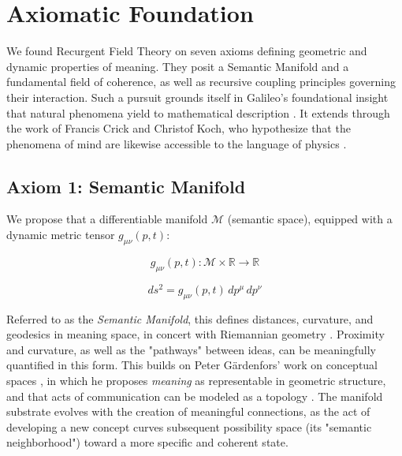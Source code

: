 \chapter{Axiomatic Foundation}
\label{1:axiomatic_foundation}

We found Recurgent Field Theory on seven axioms defining geometric and dynamic properties of meaning. They posit a Semantic Manifold and a fundamental field of coherence, as well as recursive coupling principles governing their interaction. Such a pursuit grounds itself in Galileo's foundational insight that natural phenomena yield to mathematical description \autocite{Galilei1623}. It extends through the work of Francis Crick and Christof Koch, who hypothesize that the phenomena of mind are likewise accessible to the language of physics \autocite{Crick1990, KochConsciousness2019}.


\section{Axiom 1: Semantic Manifold}
\label{1.1:axiom_1_semantic_manifold}

We propose that a differentiable manifold \(\mathcal{M}\) (semantic space), equipped with a dynamic metric tensor \(g_{\mu\nu}(p,t)\):

\begin{equation}
g_{\mu\nu}(p,t) : \mathcal{M} \times \mathbb{R} \rightarrow \mathbb{R}
\end{equation}

\begin{equation}
ds^2 = g_{\mu\nu}(p,t) \, dp^\mu \, dp^\nu
\end{equation}

Referred to as the \textit{Semantic Manifold}, this defines distances, curvature, and geodesics in meaning space, in concert with Riemannian geometry \autocite{Riemann1868}. Proximity and curvature, as well as the "pathways" between ideas, can be meaningfully quantified in this form. This builds on Peter Gärdenfors' work on conceptual spaces \autocite{Gardenfors2000}, in which he proposes \textit{meaning} as representable in geometric structure, and that acts of communication can be modeled as a topology \autocite{Gardenfors2014}. The manifold substrate evolves with the creation of meaningful connections, as the act of developing a new concept curves subsequent possibility space (its "semantic neighborhood") toward a more specific and coherent state.

